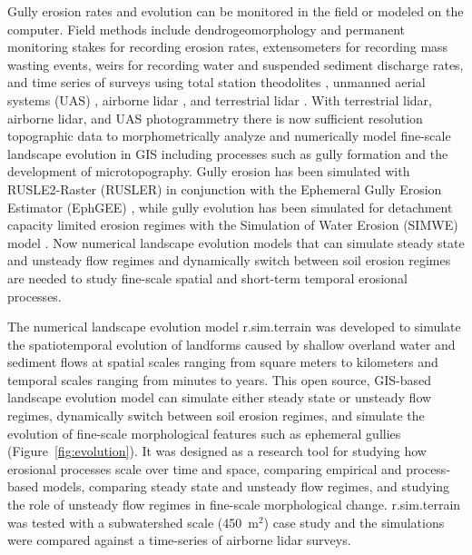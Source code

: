 \documentclass[gmd, manuscript]{copernicus}
\begin{document}
Gully erosion rates and evolution
can be monitored in the field 
or modeled on the computer. 
Field methods include
dendrogeomorphology \citep{Malik2008} and 
permanent monitoring stakes for recording erosion rates, 
extensometers for recording mass wasting events, 
weirs for recording water and suspended sediment discharge rates, 
and time series of surveys using 
total station theodolites \citep{Thomas2004},
unmanned aerial systems (UAS) \citep{Jeziorska2016,Kasprak2019,Yang2019},
airborne lidar \citep{Perroy2010,Starek2011}, 
and terrestrial lidar \citep{Starek2011,Bechet2016,Goodwin2016,Telling2017}.
With terrestrial lidar, airborne lidar, and 
UAS photogrammetry
there is now sufficient resolution topographic data 
to morphometrically analyze and 
numerically model fine-scale landscape evolution in GIS
including processes such as gully formation 
and the development of microtopography. 
Gully erosion has been simulated with 
RUSLE2-Raster (RUSLER)
in conjunction with the Ephemeral Gully Erosion Estimator (EphGEE)
\citep{Dabney2014},
while gully evolution
has been simulated for detachment capacity limited erosion regimes
with the Simulation of Water Erosion (SIMWE) model
\citep{Koco2011, Mitasova2013}. 
Now numerical landscape evolution models 
that can simulate 
steady state and unsteady flow regimes
and dynamically switch between soil erosion regimes 
are needed to study 
fine-scale spatial and short-term temporal erosional processes.

The numerical landscape evolution model 
r.sim.terrain was developed to 
simulate the spatiotemporal evolution of landforms
caused by shallow overland water and sediment flows
at spatial scales ranging from
square meters to kilometers
and temporal scales ranging from minutes to years. 
This open source, GIS-based landscape evolution model can
simulate either steady state or unsteady flow regimes,
dynamically switch between soil erosion regimes, and
simulate the evolution of fine-scale morphological features 
such as ephemeral gullies
(Figure~\ref{fig:evolution}).
It was designed as a research tool for
studying how erosional processes scale over time and space,
comparing empirical and process-based models, 
comparing steady state and unsteady flow regimes, and
studying the role of unsteady flow regimes
in fine-scale morphological change. 
r.sim.terrain was tested with 
a subwatershed scale (450~\unit{m}$^{2}$) case study
and the simulations were compared against 
a time-series of airborne lidar surveys.
\end{document}
